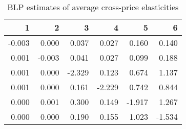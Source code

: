 \begin{table}
\centering
\caption{ BLP estimates of average cross-price elasticities}
\label{tab:blpElasticities}
\begin{tabular}{rrrrrr}
\toprule
     1 &      2 &      3 &      4 &      5 &      6 \\
\midrule
-0.003 &  0.000 &  0.037 &  0.027 &  0.160 &  0.140 \\
 0.001 & -0.003 &  0.041 &  0.027 &  0.099 &  0.188 \\
 0.001 &  0.000 & -2.329 &  0.123 &  0.674 &  1.137 \\
 0.001 &  0.000 &  0.161 & -2.229 &  0.742 &  0.844 \\
 0.000 &  0.001 &  0.300 &  0.149 & -1.917 &  1.267 \\
 0.000 &  0.000 &  0.190 &  0.155 &  1.023 & -1.534 \\
\bottomrule
\end{tabular}
\end{table}
